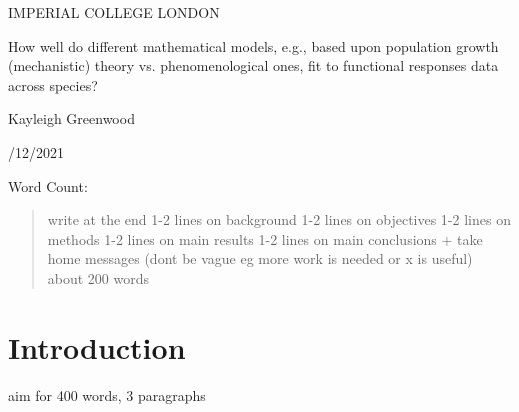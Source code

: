 \documentclass[11pt, titlepage]{article}
\newcommand{\wordcount}{}
\begin{document}
    \begin{titlepage}
    \begin{center}
            {\large IMPERIAL COLLEGE LONDON}
    \end{center}
    
    \vspace*{\fill}
    
    \begin{center}
        {\Huge How well do different mathematical models, e.g., based upon population growth (mechanistic) theory vs. phenomenological ones, fit to functional responses data across species?}
    
        \bigskip
        Kayleigh Greenwood

        /12/2021

        \bigskip
        Word Count:
        \wordcount

    \end{center}
    
    \vspace{\fill}
    
    \end{titlepage}

    \begin{abstract}
    write at the end
    1-2 lines on background
    1-2 lines on objectives
    1-2 lines on methods
    1-2 lines on main results
    1-2 lines on main conclusions + take home messages (dont be vague eg more work is needed or x is useful)
    about 200 words
    \end{abstract}

    \section*{Introduction}
    
    aim for 400 words, 3 paragraphs
\end{document}
